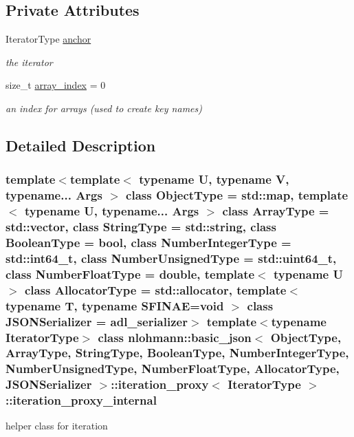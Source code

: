 \subsection*{Private Attributes}
\begin{DoxyCompactItemize}
\item 
Iterator\+Type \hyperlink{classnlohmann_1_1basic__json_1_1iteration__proxy_1_1iteration__proxy__internal_ab551ab326378a035cedb9aa9e3c7bda4}{anchor}
\begin{DoxyCompactList}\small\item\em the iterator \end{DoxyCompactList}\item 
size\+\_\+t \hyperlink{classnlohmann_1_1basic__json_1_1iteration__proxy_1_1iteration__proxy__internal_a80587417690d6b2cabc8edee491cf1ba}{array\+\_\+index} = 0
\begin{DoxyCompactList}\small\item\em an index for arrays (used to create key names) \end{DoxyCompactList}\end{DoxyCompactItemize}


\subsection{Detailed Description}
\subsubsection*{template$<$template$<$ typename U, typename V, typename... Args $>$ class Object\+Type = std\+::map, template$<$ typename U, typename... Args $>$ class Array\+Type = std\+::vector, class String\+Type = std\+::string, class Boolean\+Type = bool, class Number\+Integer\+Type = std\+::int64\+\_\+t, class Number\+Unsigned\+Type = std\+::uint64\+\_\+t, class Number\+Float\+Type = double, template$<$ typename U $>$ class Allocator\+Type = std\+::allocator, template$<$ typename T, typename S\+F\+I\+N\+A\+E=void $>$ class J\+S\+O\+N\+Serializer = adl\+\_\+serializer$>$\newline
template$<$typename Iterator\+Type$>$\newline
class nlohmann\+::basic\+\_\+json$<$ Object\+Type, Array\+Type, String\+Type, Boolean\+Type, Number\+Integer\+Type, Number\+Unsigned\+Type, Number\+Float\+Type, Allocator\+Type, J\+S\+O\+N\+Serializer $>$\+::iteration\+\_\+proxy$<$ Iterator\+Type $>$\+::iteration\+\_\+proxy\+\_\+internal}

helper class for iteration 

